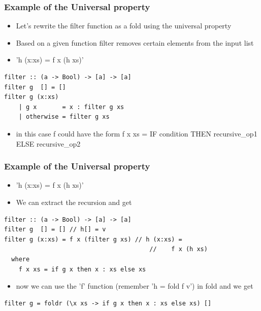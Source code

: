 \documentclass[10pt]{beamer}
\begin{document}
\begin{frame}[fragile]
\frametitle{Example of the Universal property}
\begin{itemize}
\item Let's rewrite the filter function as a fold using the universal property
\item Based on a given function filter removes certain elements from the input list 	
\item 'h (x:xs) = f x (h xs)'
\end{itemize}

\begin{lstlisting}
filter :: (a -> Bool) -> [a] -> [a]
filter g  [] = []
filter g (x:xs)  
    | g x       = x : filter g xs 
    | otherwise = filter g xs
\end{lstlisting}

\begin{itemize}
\item in this case f could have the form f x xs = IF condition THEN recursive\_op1 ELSE recursive\_op2 
\end{itemize}

\end{frame}






\begin{frame}[fragile]
\frametitle{Example of the Universal property}
\begin{itemize}
\item 'h (x:xs) = f x (h xs)'
\item We can extract the recursion and get 
\end{itemize}
\begin{lstlisting}
filter :: (a -> Bool) -> [a] -> [a]
filter g  [] = [] // h[] = v
filter g (x:xs) = f x (filter g xs) // h (x:xs) = 
                                        //    f x (h xs)
  where 
    f x xs = if g x then x : xs else xs 
\end{lstlisting}

\begin{itemize}
\item now we can use the 'f' function (remember 'h = fold f v') in fold and we get
\end{itemize}

\begin{lstlisting}
filter g = foldr (\x xs -> if g x then x : xs else xs) []
\end{lstlisting}

\end{frame}
\end{document}
